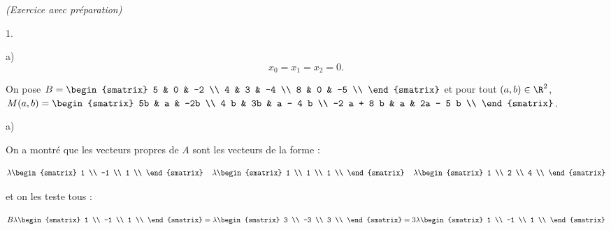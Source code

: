 \documentclass[11pt]{article}%
\begin{document}
\begin{exercice}{\it (Exercice avec préparation)}
\begin{noliste}{1.}
\begin{noliste}{a)}
\[
 x_{0} = x_{1} = x_{2} = 0. 
\]

 \end{noliste}

 \item On pose $B = \begin{smatrix}
5 & 0 & -2 \\
4 & 3 & -4 \\
8 & 0 & -5 \\
\end{smatrix}
$ et pour tout $(a,b) \in \R^{2}$, $M( a, b ) = \begin{smatrix}
5b & a & -2b \\
4 b & 3b & a - 4 b \\
-2 a + 8 b & a & 2a - 5 b \\
\end{smatrix}
$.\begin{noliste}{a)}
 \setlength{\itemsep}{2mm}

 \item On a montré que les vecteurs propres de $A$ sont les vecteurs de
la forme : 
 
\[
 \lambda \begin{smatrix}
1 \\
-1 \\
1 \\
\end{smatrix}
\ \, \ \ \lambda \begin{smatrix}
1 \\
1 \\
1 \\
\end{smatrix}
\ \, \ \ \lambda \begin{smatrix}
1 \\
2 \\
4 \\
\end{smatrix}
\]

 et on les teste tous : 
 
\[
 B \lambda \begin{smatrix}
1 \\
-1 \\
1 \\
\end{smatrix}
 = \lambda \begin{smatrix}
3 \\
-3 \\
3 \\
\end{smatrix}
 = 3 \lambda \begin{smatrix}
1 \\
-1 \\
1 \\
\end{smatrix}
\]


\end{noliste}
\end{noliste}
\end{exercice}
\end{document}
